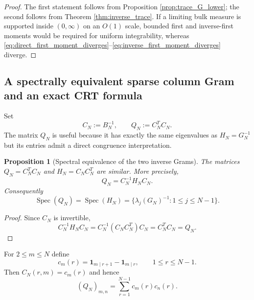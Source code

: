 \documentclass[11pt]{amsart}
\numberwithin{equation}{section}
\theoremstyle{plain}
\newtheorem{proposition}[theorem]{Proposition}
\theoremstyle{definition}
\theoremstyle{remark}
\newcommand{\Spec}{\operatorname{Spec}}
\begin{document}
\begin{proof}
The first statement follows from Proposition \ref{prop:trace_G_lower}; the second follows from Theorem \ref{thm:inverse_trace}.  If a limiting bulk measure is supported inside $(0,\infty)$ on an $O(1)$ scale, bounded first and inverse-first moments would be required for uniform integrability, whereas \eqref{eq:direct_first_moment_diverges}--\eqref{eq:inverse_first_moment_diverges} diverge.
\end{proof}


\subsection{A spectrally equivalent sparse column Gram and an exact CRT formula}
\label{subsec:column_gram_crt}

Set
\begin{equation}
C_N:=B_N^{-1},
\qquad
Q_N:=C_N^TC_N.
\label{eq:QN_definition}
\end{equation}
The matrix $Q_N$ is useful because it has exactly the same eigenvalues as $H_N=G_N^{-1}$ but its entries admit a direct congruence interpretation.

\begin{proposition}[Spectral equivalence of the two inverse Grams]
\label{prop:QH_similarity}
The matrices $Q_N=C_N^TC_N$ and $H_N=C_NC_N^T$ are similar.  More precisely,
\begin{equation}
Q_N=C_N^{-1}H_NC_N.
\label{eq:QH_similarity}
\end{equation}
Consequently
\begin{equation}
\Spec(Q_N)=\Spec(H_N)=\{\lambda_j(G_N)^{-1}:1\le j\le N-1\}.
\label{eq:QH_same_spectrum}
\end{equation}
\end{proposition}

\begin{proof}
Since $C_N$ is invertible,
\begin{equation}
C_N^{-1}H_NC_N
=C_N^{-1}(C_NC_N^T)C_N
=C_N^TC_N=Q_N.
\end{equation}
\end{proof}

For $2\le m\le N$ define
\begin{equation}
c_m(r)=\mathbf 1_{m\mid r+1}-\mathbf 1_{m\mid r},
\qquad 1\le r\le N-1.
\label{eq:cmr_definition}
\end{equation}
Then $C_N(r,m)=c_m(r)$ and hence
\begin{equation}
(Q_N)_{m,n}
=\sum_{r=1}^{N-1}c_m(r)c_n(r).
\label{eq:Q_entry_incidence}
\end{equation}
\end{document}
